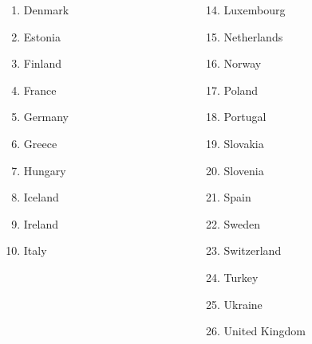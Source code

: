 \documentclass{beamer}
\begin{document}
\begin{frame}
\begin{columns}[T]
\begin{column}{4.5cm}
\begin{columns}
\begin{column}{2cm}
\begin{scriptsize}
\begin{enumerate}
						\item Denmark 	        
						\item Estonia 	        
						\item Finland 	        
						\item France 	        
						\item Germany 	        
						\item Greece 	        
						\item Hungary 	        
						\item Iceland 	        
						\item Ireland 	        		
            \item Italy 	
        \end{enumerate}\end{scriptsize}
				\end{column}
				\begin{column}{2.5cm}
					\begin{scriptsize}\begin{enumerate}			
						\item[14.] Luxembourg 	
						\item[15.] Netherlands 	
						\item[16.] Norway 	
						\item[17.] Poland 	
						\item[18.] Portugal 	
						\item[19.] Slovakia 	
						\item[20.] Slovenia 	
						\item[21.] Spain 	
						\item[22.] Sweden 	
						\item[23.] Switzerland 	
						\item[24.] Turkey 	
						\item[25.] Ukraine 	
						\item[26.] United Kingdom 						
\end{enumerate}\end{scriptsize}
				\end{column}
			\end{columns}
		\end{column}
	\end{columns}
\end{frame}
\end{document}
